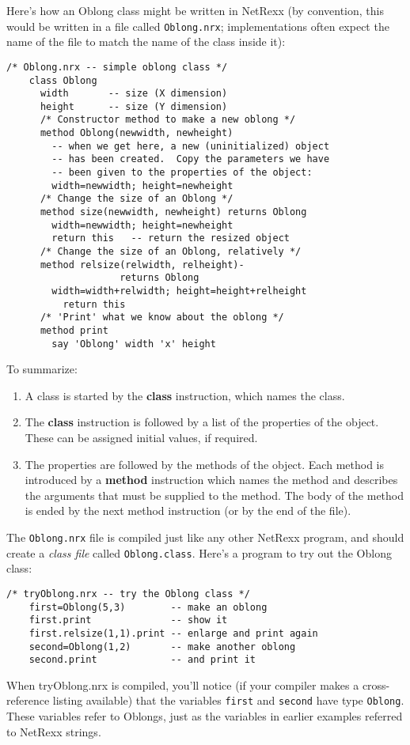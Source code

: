 Here’s how an Oblong class might be written in NetRexx (by convention,
this would be written in a file called \texttt{Oblong.nrx}; implementations
often expect the name of the file to match the name of the class
inside it):
\begin{lstlisting}[label=oblong,caption=Oblong]
    /* Oblong.nrx -- simple oblong class */
    class Oblong
      width       -- size (X dimension)
      height      -- size (Y dimension)
      /* Constructor method to make a new oblong */
      method Oblong(newwidth, newheight)
        -- when we get here, a new (uninitialized) object
        -- has been created.  Copy the parameters we have
        -- been given to the properties of the object:
        width=newwidth; height=newheight
      /* Change the size of an Oblong */
      method size(newwidth, newheight) returns Oblong
        width=newwidth; height=newheight
        return this   -- return the resized object
      /* Change the size of an Oblong, relatively */
      method relsize(relwidth, relheight)-
                    returns Oblong
        width=width+relwidth; height=height+relheight
          return this
      /* 'Print' what we know about the oblong */
      method print
        say 'Oblong' width 'x' height
\end{lstlisting}
To summarize:
\begin{enumerate}
\item A class is started by the \textbf{class} instruction, which names the class.
\item The \textbf{class} instruction is followed by a list of the properties of the object. These can be assigned initial values, if required.
\item The properties are followed by the methods of the object. Each
method is introduced by a \textbf{method} instruction which names the method
and describes the arguments that must be supplied to the method. The
body of the method is ended by the next method instruction (or by the
end of the file).
\end{enumerate}
The \texttt{Oblong.nrx} file is compiled just like any other NetRexx program,
and should create a \emph{class file} called \texttt{Oblong.class}. Here’s a program
to try out the Oblong class:
\begin{lstlisting}[label=tryoblong,caption=Try Oblong]
    /* tryOblong.nrx -- try the Oblong class */
    first=Oblong(5,3)        -- make an oblong
    first.print              -- show it
    first.relsize(1,1).print -- enlarge and print again
    second=Oblong(1,2)       -- make another oblong
    second.print             -- and print it
\end{lstlisting}
When tryOblong.nrx is compiled, you’ll notice (if your compiler makes a cross-reference listing available) that the variables \texttt{first} and \texttt{second} have type \texttt{Oblong}. These variables refer to Oblongs, just as the variables in earlier examples referred to NetRexx strings.


